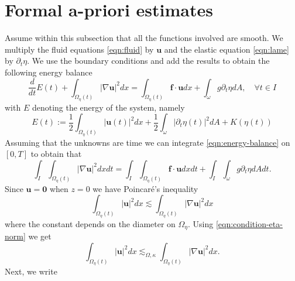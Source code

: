 \documentclass[10pt,a4paper]{article}
\numberwithin{equation}{section}
\begin{document}
\section{Formal a-priori estimates}\label{ssec:a-priori-section-paper}
Assume within this subsection that all the functions involved are smooth. 
We multiply the fluid equations \eqref{eqn:fluid} by $\mathbf{u}$ and the elastic equation \eqref{eqn:lame} by $\partial_{t}\eta$. We use the boundary conditions and add the results to obtain the following energy balance
\begin{equation}\label{eqn:energy-balance}
    \frac{d}{dt}E\left(t\right)+\int_{\Omega_{\eta}\left(t\right)}\left|\nabla\mathbf{u}\right|^{2}dx=\int_{\Omega_{\eta}\left(t\right)}\mathbf{f}\cdot\mathbf{u}dx+\int_{\omega}g\partial_{t}\eta dA,\quad\forall t\in I
\end{equation}
with $E$ denoting the energy of the system, namely
\begin{equation}\label{eqn:energy-def}
 E\left(t\right):=\frac{1}{2}\int_{\Omega_{\eta}\left(t\right)}\left|\mathbf{u}\left(t\right)\right|^{2}dx+\frac{1}{2}\int_{\omega}\left|\partial_{t}\eta\left(t\right)\right|^{2}dA+K\left(\eta\left(t\right)\right)
\end{equation}
Assuming that the unknowns are time we can integrate \eqref{eqn:energy-balance} on $[0,T]$ to obtain that 
\begin{equation}\label{eqn:diff-eq}
    \int_{I}\int_{\Omega_{\eta}\left(t\right)}\left|\nabla\mathbf{u}\right|^{2}dxdt=\int_{I}\int_{\Omega_{\eta}\left(t\right)}\mathbf{f}\cdot\mathbf{u}dxdt+\int_{I}\int_{\omega}g\partial_{t}\eta dAdt.
\end{equation}
Since $\mathbf{u}=\mathbf{0}$ when $z=0$ we have Poincar\'{e}'s inequality
\begin{equation}\label{eqn:poincare}
\int_{\Omega_{\eta}\left(t\right)}\left|\mathbf{u}\right|^{2}dx\lesssim\int_{\Omega_{\eta}\left(t\right)}\left|\nabla\mathbf{u}\right|^{2}dx
\end{equation}
where the constant depends on the diameter on $\Omega_{\eta}$. Using \eqref{eqn:condition-eta-norm}
we get  
\begin{equation}\label{eqn:y1}
\int_{\Omega_{\eta}\left(t\right)}\left|\mathbf{u}\right|^{2}dx\lesssim_{\Omega,\kappa}\int_{\Omega_{\eta}\left(t\right)}\left|\nabla\mathbf{u}\right|^{2}dx.
\end{equation}
Next, we write 
\end{document}
